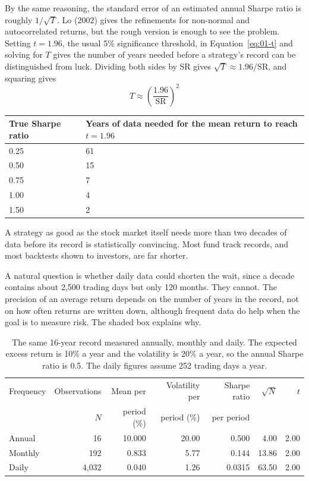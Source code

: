 By the same reasoning, the standard error of an estimated annual Sharpe ratio is roughly $1/\sqrt{T}$. Lo (2002) gives the refinements for non-normal and autocorrelated returns, but the rough version is enough to see the problem. Setting $t = 1.96$, the usual 5\% significance threshold, in Equation~\eqref{eq:01-t} and solving for $T$ gives the number of years needed before a strategy's record can be distinguished from luck. Dividing both sides by SR gives $\sqrt{T} \approx 1.96/\mathrm{SR}$, and squaring gives
\begin{equation}
  T \approx \left(\frac{1.96}{\mathrm{SR}}\right)^2
  \label{eq:01-T}
\end{equation}

\begin{center}
\small
\begin{tabular}{@{}ll@{}}
\toprule
True Sharpe ratio & Years of data needed for the mean return to reach $t = 1.96$ \\
\midrule
0.25 & 61 \\
0.50 & 15 \\
0.75 & 7 \\
1.00 & 4 \\
1.50 & 2 \\
\bottomrule
\end{tabular}
\end{center}

A strategy as good as the stock market itself needs more than two decades of data before its record is statistically convincing. Most fund track records, and most backtests shown to investors, are far shorter.

A natural question is whether daily data could shorten the wait, since a decade contains about 2,500 trading days but only 120 months. They cannot. The precision of an average return depends on the number of years in the record, not on how often returns are written down, although frequent data do help when the goal is to measure risk. The shaded box explains why.

\begin{table}[htbp]
\centering
\small
\caption{The same 16-year record measured annually, monthly and daily. The expected excess return is 10\% a year and the volatility is 20\% a year, so the annual Sharpe ratio is 0.5. The daily figures assume 252 trading days a year.}
\label{tab:01-frequency}
\begin{tabular}{@{}lrrrrrr@{}}
\toprule
Frequency & Observations & Mean per & Volatility per & Sharpe ratio & $\sqrt{N}$ & $t$ \\
 & $N$ & period (\%) & period (\%) & per period & & \\
\midrule
Annual  & 16    & 10.000 & 20.00 & 0.500  & 4.00  & 2.00 \\
Monthly & 192   & 0.833  & 5.77  & 0.144  & 13.86 & 2.00 \\
Daily   & 4{,}032 & 0.040 & 1.26  & 0.0315 & 63.50 & 2.00 \\
\bottomrule
\end{tabular}
\end{table}

